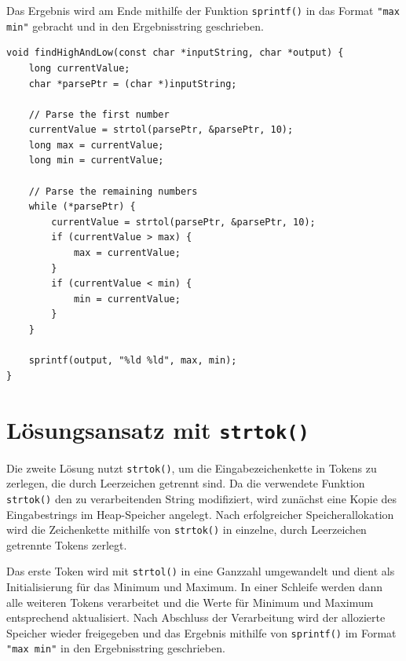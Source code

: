 Das Ergebnis wird am Ende mithilfe der Funktion \texttt{sprintf()} in
das Format \texttt{"max min"} gebracht und in den Ergebnisstring
geschrieben.

\begin{verbatim}
void findHighAndLow(const char *inputString, char *output) {
    long currentValue;
    char *parsePtr = (char *)inputString;

    // Parse the first number
    currentValue = strtol(parsePtr, &parsePtr, 10);
    long max = currentValue;
    long min = currentValue;

    // Parse the remaining numbers
    while (*parsePtr) {
        currentValue = strtol(parsePtr, &parsePtr, 10);
        if (currentValue > max) {
            max = currentValue;
        }
        if (currentValue < min) {
            min = currentValue;
        }
    }

    sprintf(output, "%ld %ld", max, min);
}
\end{verbatim}

\section*{Lösungsansatz mit \texttt{strtok()}}

Die zweite Lösung nutzt \texttt{strtok()}, um die Eingabezeichenkette in
Tokens zu zerlegen, die durch Leerzeichen getrennt sind. Da die verwendete
Funktion \texttt{strtok()} den zu verarbeitenden String modifiziert, wird
zunächst eine Kopie des Eingabestrings im Heap-Speicher angelegt. Nach
erfolgreicher Speicherallokation wird die Zeichenkette mithilfe von
\texttt{strtok()} in einzelne, durch Leerzeichen getrennte Tokens
zerlegt.

Das erste Token wird mit \texttt{strtol()} in eine Ganzzahl umgewandelt
und dient als Initialisierung für das Minimum und Maximum. In einer Schleife
werden dann alle weiteren Tokens verarbeitet und die Werte für Minimum und
Maximum entsprechend aktualisiert. Nach Abschluss der Verarbeitung wird der
allozierte Speicher wieder freigegeben und das Ergebnis mithilfe von
\texttt{sprintf()} im Format \texttt{"max min"} in den
Ergebnisstring geschrieben.

